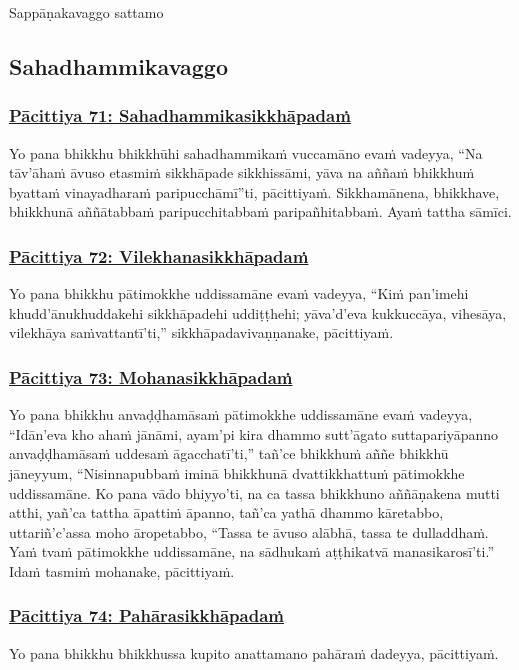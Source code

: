 \begin{center}
  Sappāṇakavaggo sattamo
\end{center}

\subsection{Sahadhammikavaggo}
\vspace{0.2cm}

\subsubsection*{\hyperref[exp71]{Pācittiya 71: Sahadhammikasikkhāpadaṁ}}
\label{pac71}
Yo pana bhikkhu bhikkhūhi sahadhammikaṁ vuccamāno evaṁ vadeyya, ``Na tāv'āhaṁ āvuso etasmiṁ sikkhāpade sikkhissāmi, yāva na aññaṁ bhikkhuṁ byattaṁ vinayadharaṁ paripucchāmī''ti, pācittiyaṁ. Sikkhamānena, bhikkhave, bhikkhunā aññātabbaṁ paripucchitabbaṁ paripañhitabbaṁ. Ayaṁ tattha sāmīci.

\subsubsection*{\hyperref[exp72]{Pācittiya 72: Vilekhanasikkhāpadaṁ}}
\label{pac72}
Yo pana bhikkhu pātimokkhe uddissamāne evaṁ vadeyya, ``Kiṁ pan'imehi khudd'ānukhuddakehi sikkhāpadehi uddiṭṭhehi; yāva'd'eva kukkuccāya, vihesāya, vilekhāya saṁvattantī'ti,'' sikkhāpadavivaṇṇanake, pācittiyaṁ.

\subsubsection*{\hyperref[exp73]{Pācittiya 73: Mohanasikkhāpadaṁ}}
\label{pac73}
Yo pana bhikkhu anvaḍḍhamāsaṁ pātimokkhe uddissamāne evaṁ vadeyya, ``Idān'eva kho ahaṁ jānāmi, ayam'pi kira dhammo sutt'āgato suttapariyāpanno anvaḍḍhamāsaṁ uddesaṁ āgacchatī'ti,'' tañ'ce bhikkhuṁ aññe bhikkhū jāneyyum, ``Nisinnapubbaṁ iminā bhikkhunā dvattikkhattuṁ pātimokkhe uddissamāne. Ko pana vādo bhiyyo'ti, na ca tassa bhikkhuno aññāṇakena mutti atthi, yañ'ca tattha āpattiṁ āpanno, tañ'ca yathā dhammo kāretabbo, uttariñ'c'assa moho āropetabbo, ``Tassa te āvuso alābhā, tassa te dulladdhaṁ. Yaṁ tvaṁ pātimokkhe uddissamāne, na sādhukaṁ aṭṭhikatvā manasikarosī'ti.'' Idaṁ tasmiṁ mohanake, pācittiyaṁ.

\subsubsection*{\hyperref[exp74]{Pācittiya 74: Pahārasikkhāpadaṁ}}
\label{pac74}
Yo pana bhikkhu bhikkhussa kupito anattamano pahāraṁ dadeyya, pācittiyaṁ.

